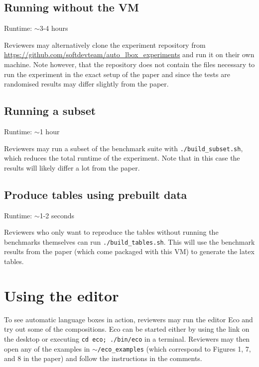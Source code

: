 \documentclass[12pt,a4paper]{article}
\begin{document}
\subsection{Running without the VM}
\label{fromscratch}

Runtime: $\sim$3-4 hours

\noindent Reviewers may alternatively clone the experiment
repository from \url{https://github.com/softdevteam/auto_lbox_experiments} and
run it on their own machine. Note however, that the repository does not contain
the files necessary to run the experiment in the exact setup of the paper and
since the tests are randomised results may differ slightly from the paper.

\subsection{Running a subset}
\label{subset}

Runtime: $\sim$1 hour

\noindent Reviewers may run a subset of the benchmark suite with
\texttt{./build\_subset.sh}, which reduces the total runtime of the experiment.
Note that in this case the results will likely differ a lot from the paper.

\subsection{Produce tables using prebuilt data}
\label{tablesonly}

Runtime: $\sim$1-2 seconds

\noindent Reviewers who only want to reproduce the tables without running the
benchmarks themselves can run \texttt{./build\_tables.sh}. This will use the
benchmark results from the paper (which come packaged with this VM) to generate
the latex tables.

\section{Using the editor}

To see automatic language boxes in action, reviewers may run the editor Eco and
try out some of the compositions. Eco can be started either by using the link
on the desktop or executing \texttt{cd eco; ./bin/eco} in a terminal. Reviewers
may then open any of the examples in \texttt{$\sim$/eco\_examples} (which correspond
to Figures 1, 7, and 8 in the paper) and follow the instructions in the comments.
\end{document}
